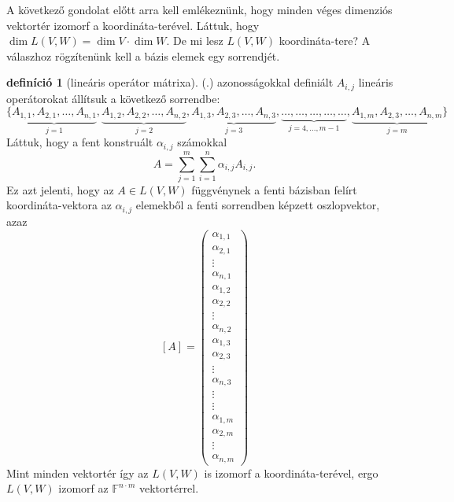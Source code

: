 \documentclass[9pt, a4paper, showtrims]{memoir}
\let\Aref\relax
\theoremstyle{plain}
\theoremstyle{remark}
\theoremstyle{definition}
\newtheorem{definition}[proposition]{definíció}
\begin{document}
A következő gondolat előtt arra kell emlékeznünk, 
hogy minden véges dimenziós vektortér izomorf a koordináta-terével.
Láttuk, hogy $\dim L\left( V,W \right)=\dim V\cdot\dim W$.
De mi lesz $L\left( V,W \right)$ koordináta-tere?
A válaszhoz rögzítenünk kell a bázis elemek egy sorrendjét.
\begin{definition}[lineáris operátor mátrixa]
    (\Aref{eq:aij}.) azonosságokkal definiált $A_{i,j}$ lineáris operátorokat állítsuk a következő sorrendbe:
    \[
        \{ 
            \underbrace{A_{1,1},A_{2,1},\dots,A_{n,1}}_{j=1},
            \underbrace{A_{1,2},A_{2,2},\dots,A_{n,2}}_{j=2},
            \underbrace{A_{1,3},A_{2,3},\dots,A_{n,3}}_{j=3},
            \underbrace{\dots,\dots,\dots,\dots,\dots}_{j=4,\dots,m-1},
            \underbrace{A_{1,m},A_{2,3},\dots,A_{n,m}}_{j=m}
        \}
    \]
    Láttuk, hogy a fent konstruált $\alpha_{i,j}$ számokkal 
    \[
        A=
        \sum_{j=1}^m\sum_{i=1}^n\alpha_{i,j}A_{i,j}.
    \]
    Ez azt jelenti, hogy az $A\in L\left( V,W \right)$ függvénynek a fenti bázisban felírt koordináta-vektora
    az $\alpha_{i,j}$ elemekből a fenti sorrendben képzett oszlopvektor, azaz
    \[
        \left[ A \right]=
        \begin{pmatrix}
            \alpha_{1,1}\\ \alpha_{2,1}\\ \vdots \\ \alpha_{n,1}\\
            \alpha_{1,2}\\ \alpha_{2,2}\\ \vdots \\ \alpha_{n,2}\\
            \alpha_{1,3}\\ \alpha_{2,3}\\ \vdots \\ \alpha_{n,3}\\
            \vdots \\ \vdots\\
            \alpha_{1,m}\\ \alpha_{2,m}\\ \vdots \\ \alpha_{n,m}
        \end{pmatrix}\tag{\dag}
    \]
    Mint minden vektortér így az $L\left( V,W \right)$ is izomorf a koordináta-terével, ergo $L\left( V,W \right)$ izomorf 
    az $\mathbb{F}^{n\cdot m}$ vektortérrel.


\end{definition}
\end{document}
